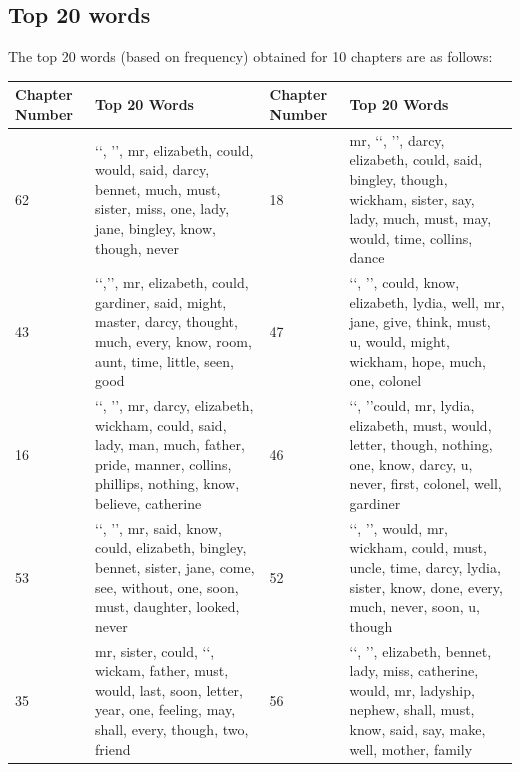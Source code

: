 \documentclass{article}
\begin{document}
\subsection{Top 20 words}
\begin{flushleft}
	The top 20 words (based on frequency) obtained for 10 chapters are as follows:
	\begin{center}
		\begin{tabular}{|p{}|p{}||p{}|p{}|}
			\hline
			Chapter Number & Top 20 Words                                                                                                                     & Chapter Number & Top 20 Words                                                                                                                                  \\
			\hline
			\hline
			62 & \lq\lq, \rq\rq, mr, elizabeth, could, would, said, darcy, bennet, much, must, sister, miss, one, lady, jane, bingley, know, though, never &
			18 & mr, \lq\lq, \rq\rq, darcy, elizabeth, could, said, bingley, though, wickham, sister, say, lady, much, must, may, would, time, collins, dance\\
			\hline
            43 & \lq\lq,\rq\rq, mr, elizabeth, could, gardiner, said, might, master, darcy, thought, much, every, know, room, aunt, time, little, seen, good & 
            47 &  \lq\lq, \rq\rq, could, know, elizabeth, lydia, well, mr, jane, give, think, must, u, would, might, wickham, hope, much, one, colonel  \\
			\hline
			16 & \lq\lq, \rq\rq, mr, darcy, elizabeth, wickham, could, said, lady, man, much, father, pride, manner, collins, phillips, nothing, know, believe, catherine &
			46 & \lq\lq, \rq\rq could, mr, lydia, elizabeth, must, would, letter, though, nothing, one, know, darcy, u, never, first, colonel, well, gardiner\\
			\hline
			53 & \lq\lq, \rq\rq, mr, said, know, could, elizabeth, bingley, bennet, sister, jane, come, see, without, one, soon, must, daughter, looked, never &
			52 & \lq\lq, \rq\rq, would, mr, wickham, could, must, uncle, time, darcy, lydia, sister, know, done, every, much, never, soon, u, though  \\
			\hline
			35 & mr, sister, could, \lq\lq, wickam, father, must, would, last, soon, letter, year, one, feeling, may, shall, every, though, two, friend   &
			56 & \lq\lq, \rq\rq, elizabeth, bennet, lady, miss, catherine, would, mr, ladyship, nephew, shall, must, know, said, say, make, well, mother, family \\
			\hline
		\end{tabular}
	\end{center}
\end{flushleft}
\end{document}
